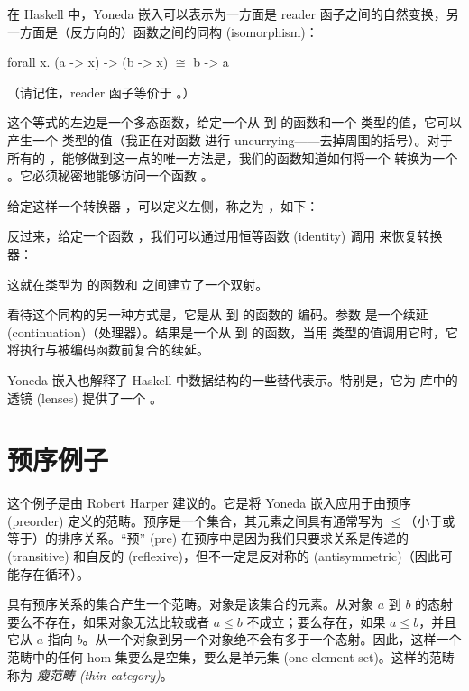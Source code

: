 在 Haskell 中，Yoneda 嵌入可以表示为一方面是 reader 函子之间的自然变换，另一方面是（反方向的）函数之间的同构 (isomorphism)：

\begin{snipv}
forall x. (a -> x) -> (b -> x) \ensuremath{\cong} b -> a
\end{snipv}
（请记住，reader 函子等价于 。）

这个等式的左边是一个多态函数，给定一个从  到  的函数和一个  类型的值，它可以产生一个  类型的值（我正在对函数  进行 uncurrying——去掉周围的括号）。对于所有的 ，能够做到这一点的唯一方法是，我们的函数知道如何将一个  转换为一个 。它必须秘密地能够访问一个函数 。

给定这样一个转换器 ，可以定义左侧，称之为 ，如下：

反过来，给定一个函数 ，我们可以通过用恒等函数 (identity) 调用  来恢复转换器：

这就在类型为  的函数和  之间建立了一个双射。

看待这个同构的另一种方式是，它是从  到  的函数的  编码。参数  是一个续延 (continuation)（处理器）。结果是一个从  到  的函数，当用  类型的值调用它时，它将执行与被编码函数前复合的续延。

Yoneda 嵌入也解释了 Haskell 中数据结构的一些替代表示。特别是，它为  库中的透镜 (lenses) 提供了一个 。

\section{预序例子}

这个例子是由 Robert Harper 建议的。它是将 Yoneda 嵌入应用于由预序 (preorder) 定义的范畴。预序是一个集合，其元素之间具有通常写为 $\leqslant$（小于或等于）的排序关系。“预” (pre) 在预序中是因为我们只要求关系是传递的 (transitive) 和自反的 (reflexive)，但不一定是反对称的 (antisymmetric)（因此可能存在循环）。

具有预序关系的集合产生一个范畴。对象是该集合的元素。从对象 $a$ 到 $b$ 的态射要么不存在，如果对象无法比较或者 $a \leqslant b$ 不成立；要么存在，如果 $a \leqslant b$，并且它从 $a$ 指向 $b$。从一个对象到另一个对象绝不会有多于一个态射。因此，这样一个范畴中的任何 hom-集要么是空集，要么是单元集 (one-element set)。这样的范畴称为 \emph{瘦范畴 (thin category)}。

